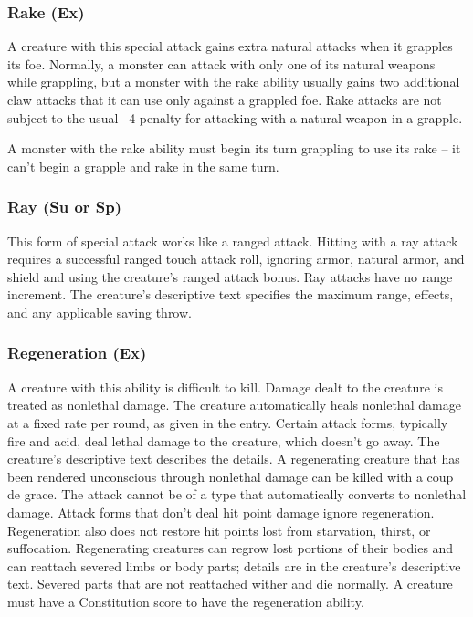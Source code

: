 \subsubsection{Rake (Ex)} A creature with this special attack gains extra natural attacks when it grapples its foe. Normally, a monster can attack with only one of its natural weapons while grappling, but a monster with the rake ability usually gains two additional claw attacks that it can use only against a grappled foe. Rake attacks are not subject to the usual –4 penalty for attacking with a natural weapon in a grapple.

A monster with the rake ability must begin its turn grappling to use its rake -- it can't begin a grapple and rake in the same turn.

\subsubsection{Ray (Su or Sp)} This form of special attack works like a ranged attack. Hitting with a ray attack requires a successful ranged touch attack roll, ignoring armor, natural armor, and shield and using the creature's ranged attack bonus. Ray attacks have no range increment. The creature's descriptive text specifies the maximum range, effects, and any applicable saving throw.

\subsubsection{Regeneration (Ex)} A creature with this ability is difficult to kill. Damage dealt to the creature is treated as nonlethal damage. The creature automatically heals nonlethal damage at a fixed rate per round, as given in the entry. Certain attack forms, typically fire and acid, deal lethal damage to the creature, which doesn't go away. The creature's descriptive text describes the details. A regenerating creature that has been rendered unconscious through nonlethal damage can be killed with a coup de grace. The attack cannot be of a type that automatically converts to nonlethal damage.
Attack forms that don't deal hit point damage ignore regeneration. Regeneration also does not restore hit points lost from starvation, thirst, or suffocation. Regenerating creatures can regrow lost portions of their bodies and can reattach severed limbs or body parts; details are in the creature's descriptive text. Severed parts that are not reattached wither and die normally.
A creature must have a Constitution score to have the regeneration ability.

